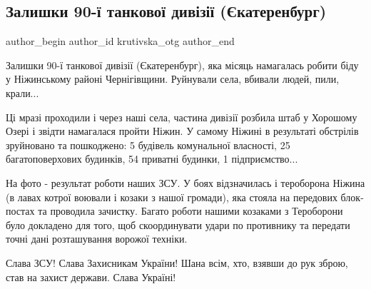  
 
 
 
 
 
\subsection{Залишки 90-ї танкової дивізії (Єкатеренбург)}
\label{sec:15_04_2022.fb.krutivska_otg.1.zalyshky_divizii_ekaterinburg}
 
\ifcmt
 author_begin
   author_id krutivska_otg
 author_end
\fi

Залишки 90-ї танкової дивізії (Єкатеренбург), яка місяць намагалась робити біду
у Ніжинському районі Чернігівщини. Руйнували села, вбивали людей, пили,
крали... 


Ці мразі проходили і через наші села, частина дивізії розбила штаб у Хорошому
Озері і звідти намагалася пройти Ніжин. У самому Ніжині в результаті обстрілів
зруйновано та пошкоджено: 5 будівель комунальної власності, 25 багатоповерхових
будинків, 54 приватні будинки, 1 підприємство... 


На фото - результат роботи наших ЗСУ. У боях відзначилась і тероборона Ніжина
(в лавах котрої воювали і козаки з нашої громади), яка стояла на передових
блок-постах та проводила зачистку. Багато роботи нашими козаками з Тероборони
було докладено для того, щоб скоординувати удари по противнику та передати
точні дані розташування ворожої техніки.

Слава ЗСУ! Слава Захисникам України! Шана всім, хто, взявши до рук зброю, став
на захист держави. Слава Україні!

